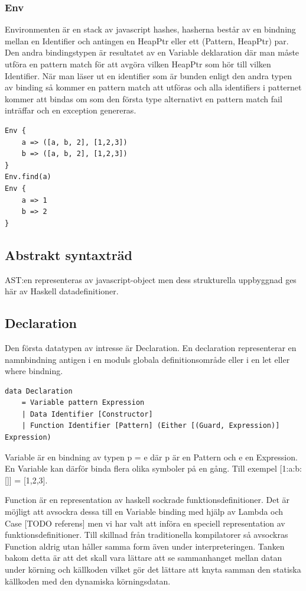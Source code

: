 \subsubsection{Env}
Environmenten är en stack av javascript hashes, hasherna består av en bindning mellan en Identifier och antingen en HeapPtr eller ett (Pattern, HeapPtr) par.  Den andra bindingstypen är resultatet av en Variable deklaration där man måste utföra en pattern match för att avgöra vilken HeapPtr som hör till vilken Identifier. När man läser ut en identifier som är bunden enligt den andra typen av binding så kommer en pattern match att utföras och alla identifiers i patternet kommer att bindas om som den första type alternativt en pattern match fail inträffar och en exception genereras.

\begin{lstlisting}
Env {
    a => ([a, b, 2], [1,2,3])
    b => ([a, b, 2], [1,2,3])
}
Env.find(a)
Env {
    a => 1
    b => 2
}
\end{lstlisting}

\subsection{Abstrakt syntaxträd} 
AST:en representeras av javascript-object men dess strukturella uppbyggnad ges här av Haskell datadefinitioner.

\subsection{Declaration}
Den första datatypen av intresse är Declaration. En declaration representerar en namnbindning antigen i en moduls globala definitionsområde eller i en let eller where bindning.

\begin{lstlisting}
data Declaration 
    = Variable pattern Expression
    | Data Identifier [Constructor]
    | Function Identifier [Pattern] (Either [(Guard, Expression)] Expression)
\end{lstlisting}

Variable är en bindning av typen p = e där p är en Pattern och e en Expression. En Variable kan därför binda flera olika symboler på en gång. Till exempel [1:a:b:[]] = [1,2,3].

Function är en representation av haskell sockrade funktionsdefinitioner. Det är möjligt att avsockra dessa till en Variable binding med hjälp av Lambda och Case [TODO referens] men vi har valt att införa en speciell representation av funktionsdefinitioner. Till skillnad från traditionella kompilatorer så avsockras Function aldrig utan håller samma form även under interpreteringen. Tanken bakom detta är att det skall vara lättare att se sammanhanget mellan datan under körning och källkoden vilket gör det lättare att knyta samman den statiska källkoden med den dynamiska körningsdatan.

